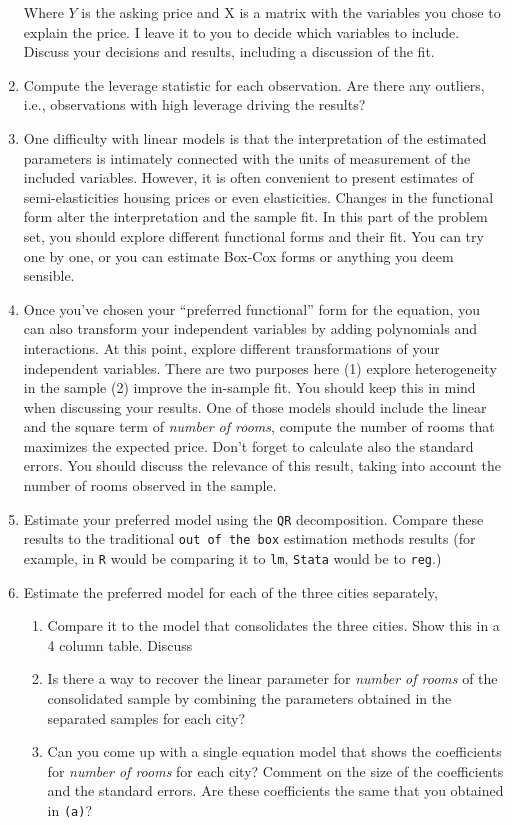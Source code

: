 \documentclass[12pt,onecolumn]{article}
\begin{document}
\begin{enumerate}
  Where $Y$ is the asking price and X  is a matrix with the variables you chose to explain the price. I leave it to you to decide which variables to include. Discuss your decisions and results, including a discussion of the fit.
  \item Compute the leverage statistic for each observation. Are there any outliers, i.e., observations with high leverage driving the results?
  \item One difficulty with linear models is that the interpretation of the estimated parameters is intimately connected with the units of measurement of the included variables. However,  it is often convenient to present estimates of semi-elasticities housing prices or even elasticities. Changes in the functional form alter the interpretation and the sample fit. In this part of the problem set, you should explore different functional forms and their fit. You can try one by one, or you can estimate Box-Cox forms or anything you deem sensible.
  \item Once you've chosen your ``preferred functional'' form for the equation, you can also transform your independent variables by adding polynomials and interactions. At this point, explore different transformations of your independent variables. There are two purposes here (1) explore heterogeneity in the sample (2) improve the in-sample fit. You should keep this in mind when discussing your results. One of those models should include the linear and the square term of {\it number of rooms}, compute the number of rooms that maximizes the expected price. Don't forget to calculate also the standard errors. You should discuss the relevance of this result, taking into account the number of rooms observed in the sample.
  \item Estimate your preferred model using the \texttt{QR} decomposition. Compare these results to the traditional \texttt{out of the box} estimation methods results (for example, in \texttt{R} would be comparing it to \texttt{lm}, \texttt{Stata} would be to \texttt{reg}.)
  \item Estimate the preferred model for each of the three cities separately, 
  \begin{enumerate}
    \item Compare it to the model that consolidates the three cities. Show this in a 4 column table. Discuss
    \item Is there a way to recover the linear parameter for  {\it number of rooms} of the consolidated sample by combining the parameters obtained in the separated samples for each city? 
    \item Can you come up with a single equation model that shows the coefficients for {\it number of rooms} for each city? Comment on the size of the coefficients and the standard errors. Are these coefficients the same that you obtained in \texttt{(a)}?
  \end{enumerate}
  


\end{enumerate}
\end{document}
